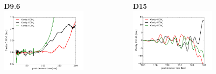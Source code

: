 \documentclass[aspectratio=169]{beamer}
\begin{document}
\begin{frame}

  \begin{columns}[c]

    \begin{figure}
      \textbf{D9.6}
      \includegraphics[width=1.0\textwidth]{Figures/D9.6_com.pdf}
    \end{figure}

    \begin{figure}
      \textbf{D15}
      \includegraphics[width=1.0\textwidth]{Figures/D15_com.pdf}
    \end{figure}


\end{columns}
\end{frame}
\end{document}
